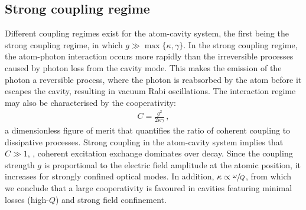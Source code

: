 \documentclass[../Thesis-IJspeert.tex]{subfiles}
\begin{document}
\subsection{Strong coupling regime}
\label{sec:strongcoupling}
Different coupling regimes exist for the atom-cavity system, the first being the strong coupling regime, in which $g \gg \max \{\kappa,\gamma\}$. In the strong coupling regime, the atom-photon interaction occurs more rapidly than the irreversible processes caused by photon loss from the cavity mode. This makes the emission of the photon a reversible process, where the photon is reabsorbed by the atom before it escapes the cavity, resulting in vacuum Rabi oscillations. The interaction regime may also be characterised by the cooperativity:%
\begin{align}
\label{cooperativity}
	C=\frac{g^2}{2\kappa\gamma}\,,
\end{align}
a dimensionless figure of merit that quantifies the ratio of coherent coupling to dissipative processes. Strong coupling in the atom-cavity system implies that $C \gg 1$, \ie, coherent excitation exchange dominates over decay. Since the coupling strength $g$ is proportional to the electric field amplitude at the atomic position, it increases for strongly confined optical modes. In addition, $\kappa \propto \sfrac{\omega}{Q}$, from which we conclude that a large cooperativity is favoured in cavities featuring minimal losses (high-$Q$) and strong field confinement.
\end{document}
